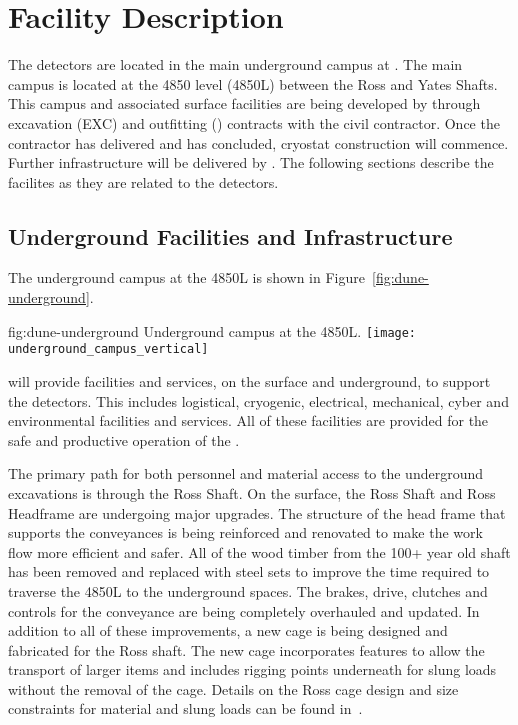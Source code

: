 \chapter{Facility Description}
\label{vl:tc-facility}

The  detectors are located in the main underground campus
at . The main campus is located at the 4850 level (4850L) between
the Ross and Yates Shafts. This campus and associated surface
facilities are being developed by  through excavation
(EXC) and outfitting () contracts with the civil
contractor. Once the contractor has delivered and  has
concluded, cryostat construction will commence. Further infrastructure
will be delivered by .  The following sections describe
the facilites as they are related to the  detectors.

\section{Underground Facilities and Infrastructure}
\label{sec:fdsp-coord-uderground-excavation}

The  underground campus at the  4850L is shown in
Figure~\ref{fig:dune-underground}.
\begin{dunefigure}{fig:dune-underground}
  {Underground campus at the 4850L.}
  \texttt{[image: underground\_campus\_vertical]}
\end{dunefigure}
 will provide facilities and services, on the surface and
underground, to support the  detectors.  This includes
logistical, cryogenic, electrical, mechanical, cyber and environmental
facilities and services.  All of these facilities are provided for the
safe and productive operation of the .

The primary path for both personnel and material access to the
underground excavations is through the Ross Shaft. On the surface, the
Ross Shaft and Ross Headframe are undergoing major upgrades. The
structure of the head frame that supports the conveyances is being
reinforced and renovated to make the work flow more efficient and
safer.  All of the wood timber from the 100+ year old shaft has been
removed and replaced with steel sets to improve the time required to
traverse the 4850L to the underground spaces.  The brakes, drive,
clutches and controls for the conveyance are being completely
overhauled and updated.  In addition to all of these improvements, a
new cage is being designed and fabricated for the Ross shaft.  The new
cage incorporates features to allow the transport of larger items and
includes rigging points underneath for slung loads without the removal
of the cage.  Details on the Ross cage design and size constraints for
material and slung loads can be found in~.

